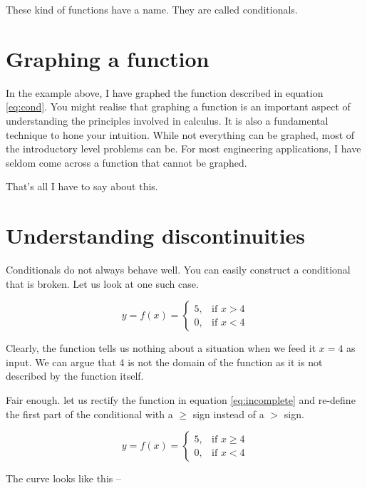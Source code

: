 These kind of functions have a name. They are called conditionals.

\section{Graphing a function}

In the example above, I have graphed the function described in equation \eqref{eq:cond}. You might realise that graphing a function is an important aspect of understanding the principles involved in calculus. It is also a fundamental technique to hone your intuition. While not everything can be graphed, most of the introductory level problems can be. For most engineering applications, I have seldom come across a function that cannot be graphed.

That's all I have to say about this.

\section{Understanding discontinuities}

Conditionals do not always behave well. You can easily construct a conditional that is broken. Let us look at one such case.

\begin{equation}
    y = f(x)=
\begin{cases}
    5 ,& \text{if } x > 4\\
    0, & \text{if } x < 4
\end{cases}
\label{eq:incomplete}
\end{equation}

Clearly, the function tells us nothing about a situation when we feed it $x=4$ as input. We can argue that 4 is not the domain of the function as it is not described by the function itself.

Fair enough. let us rectify the function in equation \eqref{eq:incomplete} and re-define the first part of the conditional with a $\geq$ sign instead of a $>$ sign.

\begin{equation}
    y = f(x)=
\begin{cases}
    5 ,& \text{if } x \geq 4\\
    0, & \text{if } x < 4
\end{cases}
\label{eq:complete}
\end{equation}

The curve looks like this --

